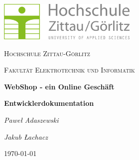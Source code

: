 \documentclass[a4paper,12pt]{article}
\begin{document}
\begin{titlepage}
	\centering
	\includegraphics[width=0.5\textwidth]{Bilder/hszglogo.png}\par\vspace{1cm}
	{\scshape\LARGE Hochschule Zittau-Görlitz \par}
	{\scshape\Large Fakultät Elektrotechnik und Informatik\par}
	\vspace{5cm}
	{\huge\bfseries WebShop - ein Online Geschäft\par}
	{\LARGE\bfseries Entwicklerdokumentation\par}

	\vspace{6cm}
	{\Large\itshape Paweł Adaszewski\par}
	{\Large\itshape Jakub Łachacz\par}


	\vfill

	{\large \today\par}
\end{titlepage}
\end{document}
